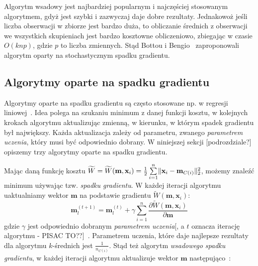 \documentclass{praca1}
\DeclarePairedDelimiter{\norm}{\lVert}{\rVert}
\begin{document}
Algorytm wsadowy jest najbardziej popularnym i najczęściej stosowanym algorytmem, gdyż jest szybki i zazwyczaj daje dobre rezultaty. Jednakowoż jeśli liczba obserwacji w zbiorze jest bardzo duża, to obliczanie średnich z obserwacji we wszystkich skupieniach jest bardzo kosztowne obliczeniowo, zbiegając w czasie $O(knp)$, gdzie $p$ to liczba zmiennych. Stąd Bottou i Bengio~\cite{Bottou1995:convergenceproperties} zaproponowali algorytm oparty na stochastycznym spadku gradientu.

\subsection{Algorytmy oparte na spadku gradientu}

Algorytmy oparte na spadku gradientu są często stosowane np. w regresji liniowej~\cite{Bottou2012:sgdtricks}. Idea polega na szukaniu minimum z danej funkcji kosztu, w kolejnych krokach algorytmu aktualizując zmienną, w kierunku, w którym spadek gradientu był największy. Każda aktualizacja zależy od parametru, zwanego \emph{parametrem uczenia}, który musi być odpowiednio dobrany. W niniejszej sekcji [podrozdziale?] opiszemy trzy algorytmy oparte na spadku gradientu.


Mając daną funkcję kosztu $\widetilde{W} = \widetilde{W}(\mathbf{m}, \mathbf{x}_i) = \frac{1}{2}\sum\limits_{i=1}^{n} \norm{\mathbf{x}_i - \mathbf{m}_{C(i)}}_2^2 $, możemy znaleźć minimum używając tzw. \emph{spadku gradientu}. W każdej iteracji algorytmu uaktualniamy wektor $\mathbf{m}$ na podstawie gradientu $\widetilde{W}(\mathbf{m}, \mathbf{x}_i)$:
\begin{equation}
\mathbf{m}^{(t+1)}_l = \mathbf{m}_l^{(t)} + \gamma \sum\limits_{i=1}^{n} \frac{\partial \widetilde{W}(\mathbf{m}, \mathbf{x}_i)}{\partial \mathbf{m}}
\end{equation}
gdzie $\gamma$ jest odpowiednio dobranym \emph{parametrem uczenia}[, a $t$ oznacza iterację algorytmu - PISAC TO??]~\cite{Bottou2012:sgdtricks}. Parametrem uczenia, które daje najlepsze rezultaty dla algorytmu $k$-średnich jest $\frac{1}{n_{C(i)}}$. Stąd też algorytm \emph{wsadowego spadku gradientu}, w każdej iteracji algorytmu aktualizuje wektor $\mathbf{m}$ następująco~\cite{Bottou1995:convergenceproperties}:

\end{document}
